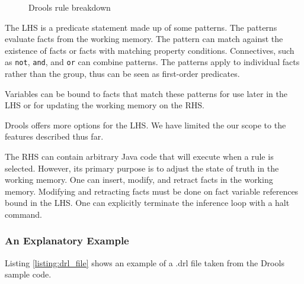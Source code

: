 \begin{figure}
    \centering
    \caption{Drools rule breakdown}
    \label{fig:Drools_Rule_Breakdown}
\end{figure}

The LHS is a predicate statement made up of some patterns.
The patterns evaluate facts from the working memory.
The pattern can match against the existence of facts or facts with matching property conditions.
Connectives, such as \texttt{not}, \texttt{and}, and \texttt{or} can combine patterns.
The patterns apply to individual facts rather than the group, thus can be seen as first-order predicates.

Variables can be bound to facts that match these patterns for use later in the LHS or for updating the working memory on the RHS.

Drools offers more options for the LHS.
We have limited the our scope to the features described thus far.

The RHS can contain arbitrary Java code that will execute when a rule is selected.
However, its primary purpose is to adjust the state of truth in the working memory.
One can insert, modify, and retract facts in the working memory.
Modifying and retracting facts must be done on fact variable references bound in the LHS.
One can explicitly terminate the inference loop with a halt command.


\subsubsection{An Explanatory Example}
Listing \ref{listing:drl_file} shows an example of a .drl file taken from the Drools sample code.

